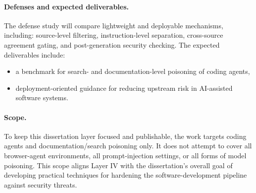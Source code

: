 \documentclass[11pt]{article}
\begin{document}
\paragraph{Defenses and expected deliverables.}
The defense study will compare lightweight and deployable mechanisms, including:
source-level filtering,
instruction-level separation,
cross-source agreement gating,
and post-generation security checking.
The expected deliverables include:
\begin{itemize}
    \item a benchmark for search- and documentation-level 
    poisoning of coding agents,
    \item deployment-oriented guidance for reducing upstream 
    risk in AI-assisted software systems.
\end{itemize}

\paragraph{Scope.}
To keep this dissertation layer focused and publishable,
the work targets coding agents and documentation/search poisoning only.
It does not attempt to cover all browser-agent environments,
all prompt-injection settings,
or all forms of model poisoning.
This scope aligns Layer IV with the dissertation's 
overall goal of developing practical 
techniques for hardening the software-development 
pipeline against security threats.









\end{document}
